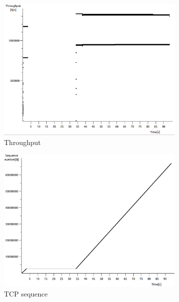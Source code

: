 \documentclass[conference,a4paper]{../../sty/IEEEtran}
\begin{document}
\begin{figure}
 \centering
 \begin{subfigure}[b]{0.2\textwidth}
  \includegraphics[width=\textwidth]{s9-0_th}
  \caption{Throughput}
 \end{subfigure}
 \begin{subfigure}[b]{0.2\textwidth}
  \includegraphics[width=\textwidth]{s9-0_seq}
  \caption{TCP sequence}
 \end{subfigure}
 \begin{subfigure}[b]{0.2\textwidth}

\end{subfigure}
\end{figure}
\end{document}
